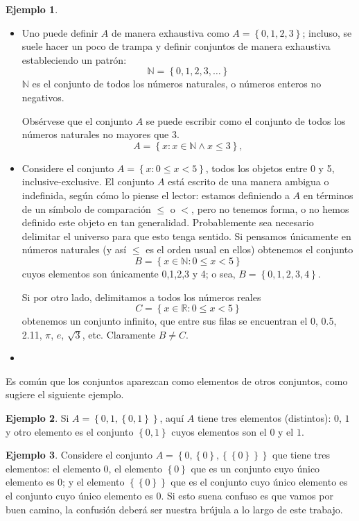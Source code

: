 \documentclass{book}
\newcommand{\set}[1]{\left\lbrace #1 \right\rbrace }
\theoremstyle{definition}
\newtheorem{ejm}{Ejemplo}[chapter]
\begin{document}
\begin{ejm}	\begin{itemize}
	\item Uno puede definir $A$ de manera exhaustiva como $A=\set{0,1,2,3}$; incluso, se suele hacer un poco de trampa y definir conjuntos de manera exhaustiva estableciendo un patrón:
	\[\mathbb{N} = \set{0,1,2,3,\ldots}\]
	$\mathbb{N}$ es el conjunto de todos los números naturales, o números enteros no negativos.
	
	Obsérvese que el conjunto $A$ se puede escribir como el conjunto de todos los números naturales no mayores que 3.
	\[A = \set{x : x \in \mathbb{N} \wedge x \leq 3},\]
	
	\item Considere el conjunto $A=\set{x : 0\leq x < 5}$, todos los objetos entre 0 y 5, inclusive-exclusive. El conjunto $A$ está escrito de una manera ambigua o indefinida, según cómo lo piense el lector: estamos definiendo a $A$ en términos de un símbolo de comparación $\leq$ o $<$, pero no tenemos forma, o no hemos definido este objeto en tan generalidad. Probablemente sea necesario delimitar el universo para que esto tenga sentido. 
	Si pensamos únicamente en números naturales (y así $\leq$ es el orden usual en ellos) obtenemos el conjunto
	\[B = \set{x \in \mathbb{N}: 0\leq x < 5}\]
	cuyos elementos son únicamente 0,1,2,3 y 4; o sea, $B = \set{0,1,2,3,4}$.
	
	Si por otro lado, delimitamos a todos los números reales
	\[C = \set{x \in \mathbb{R}: 0\leq x < 5}\]
	obtenemos un conjunto infinito, que entre sus filas se encuentran el 0, 0.5, 2.11, $\pi$, $e$, $\sqrt{3}$, etc.
	Claramente $B \neq C$.
	
	\item %
\end{itemize}\end{ejm}

Es común que los conjuntos aparezcan como elementos de otros conjuntos, como sugiere el siguiente ejemplo.
\begin{ejm}
	Si $A = \set{0,1, \set{0,1}}$, aquí $A$ tiene tres elementos (distintos): $0$, $1$ y otro elemento es el conjunto $\set{0,1}$ cuyos elementos son el $0$ y el $1$.
\end{ejm}

\begin{ejm}
	Considere el conjunto $A= \set{0,\set{0}, \set{\set{0}}}$ que tiene tres elementos: el elemento $0$, el elemento $\set{0}$ que es un conjunto cuyo único elemento es $0$; y el elemento $\set{\set{0}}$ que es el conjunto cuyo único elemento es el conjunto cuyo único elemento es $0$.
	Si esto suena confuso es que vamos por buen camino, la confusión deberá ser nuestra brújula a lo largo de este trabajo.
\end{ejm}
\end{document}

